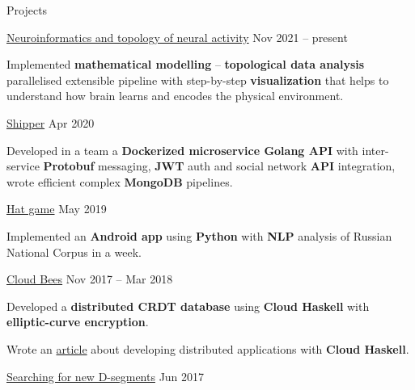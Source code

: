 \documentclass{resume}
\begin{document}
\begin{rSection}{Projects}
    \begin{rSubsection}
        {\href{https://drive.google.com/file/d/1HGRlRsa_UH2BsYTqJZ3_i_11xEufgxIt/view?usp=sharing}{Neuroinformatics and topology of neural activity}}
            {Nov 2021 -- present}{}{}

    \item Implemented \textbf{mathematical modelling} -- \textbf{topological data analysis}
      parallelised extensible pipeline with
      step-by-step \textbf{visualization} that helps to understand
      how brain learns and encodes the physical environment.
    \end{rSubsection}

    \begin{rSubsection}
        {\href{https://gitlab.com/shipr1505/backend}{Shipper}}
            {Apr 2020}{}{}

    \item Developed in a team a \textbf{Dockerized microservice Golang API} with inter-service \textbf{Protobuf} messaging,
      \textbf{JWT} auth and social network \textbf{API} integration, wrote efficient complex \textbf{MongoDB} pipelines.
    \end{rSubsection}

    \begin{rSubsection}
        {\href{https://gitlab.com/SenchoPens/hatapp}{Hat game}}
            {May 2019}{}{}

    \item Implemented an \textbf{Android app} using \textbf{Python} with \textbf{NLP} analysis of Russian National Corpus in a week.
    \end{rSubsection}

    \begin{rSubsection}
        {\href{https://github.com/SenchoPens/cloud-bees}{Cloud Bees}}
            {Nov 2017 -- Mar 2018}{}{}

    \item Developed a \textbf{distributed CRDT database} using \textbf{Cloud Haskell} with \textbf{elliptic-curve encryption}.
    \item Wrote an \href{https://github.com/mreluzeon/block-monad}{article} about developing distributed applications with \textbf{Cloud Haskell}.
    \end{rSubsection}

    \begin{rSubsection}
        {\href{https://github.com/SenchoPens/bioinformatic}{Searching for new D-segments}}
            {Jun 2017}{}{}


\end{rSubsection}
\end{rSection}
\end{document}
